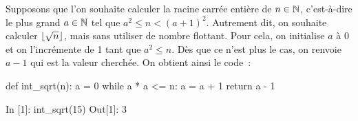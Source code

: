 \documentclass{magnolia}
\begin{document}
Supposons que l'on souhaite calculer la racine carrée
entière de $n\in\mathbb{N}$, c'est-à-dire le plus grand $a\in\mathbb{N}$ tel que $a^2 \leq n < (a+1)^2$.
Autrement dit, on souhaite calculer $\left\lfloor\sqrt{n}\right\rfloor$, mais sans utiliser de nombre
flottant. Pour cela, on initialise $a$ à 0 et on l'incrémente de 1 tant que $a^2 \leq n$.
Dès que ce n'est plus le cas, on renvoie $a-1$ qui est la valeur cherchée. On obtient
ainsi le code~:
\begin{pythoncodeline}
def int_sqrt(n):
    a = 0
    while a * a <= n:
        a = a + 1
    return a - 1
\end{pythoncodeline}


\begin{pythoncode}
In [1]: int_sqrt(15)
Out[1]: 3
\end{pythoncode}

\end{document}
